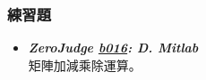 \subsubsection*{練習題}
\begin{itemize}[label={\Checkmark}]
\item \textbf{\textit{ZeroJudge \href{http://zerojudge.tw/ShowProblem?problemid=b016}{b016}: D. Mitlab}}\\
矩陣加減乘除運算。
\end{itemize}